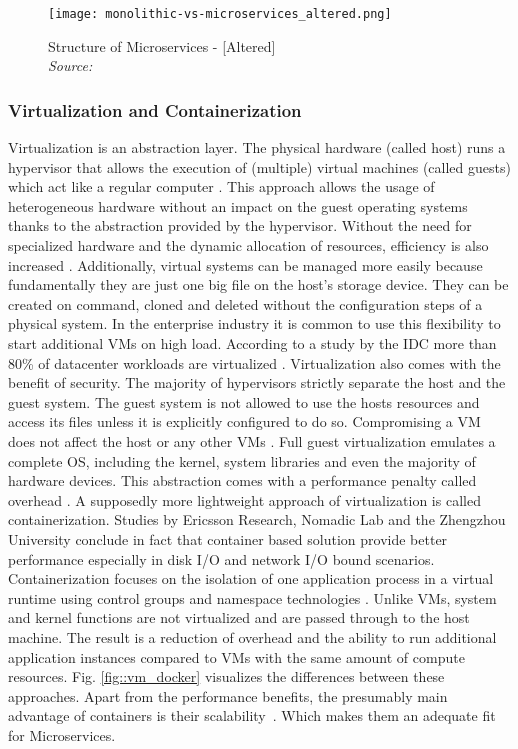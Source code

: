 \documentclass[12pt, a4paper]{article}
\begin{document}
        \begin{figure}
            \centering
            \texttt{[image: monolithic-vs-microservices\_altered.png]}
            \caption{Structure of Microservices - [Altered] \\\textit{Source:~\cite{redhat_micro}}}\label{fig::micro}
        \end{figure}

        \subsubsection{Virtualization and Containerization}
        Virtualization is an abstraction layer. The physical hardware (called host) runs a hypervisor that allows the execution of (multiple) virtual machines (called guests) which act like a regular computer \cite{vmbasics}. This approach allows the usage of heterogeneous hardware without an impact on the guest operating systems thanks to the abstraction provided by the hypervisor. Without the need for specialized hardware and the dynamic allocation of resources, efficiency is also increased \cite{redhat_venv}. Additionally, virtual systems can be managed more easily because fundamentally they are just one big file on the host's storage device. They can be created on command, cloned and deleted without the configuration steps of a physical system. In the enterprise industry it is common to use this flexibility to start additional \ac{VM}s on high load. According to a study by the \ac{IDC} more than 80\% of datacenter workloads are virtualized \cite{virtualaddoption}. Virtualization also comes with the benefit of security. The majority of hypervisors strictly separate the host and the guest system. The guest system is not allowed to use the hosts resources and access its files unless it is explicitly configured to do so. Compromising a \ac{VM} does not affect the host or any other \ac{VM}s \cite{redhat_venv}.\newline
        Full guest virtualization emulates a complete \ac{OS}, including the kernel, system libraries and even the majority of hardware devices. This abstraction comes with a performance penalty called overhead \cite{vmbasics}. A supposedly more lightweight approach of virtualization is called containerization. Studies by Ericsson Research, Nomadic Lab \cite{ieee_perfomance} and the Zhengzhou University \cite{zhengzhou_university} conclude in fact that container based solution provide better performance especially in disk \acs{I/O} and network \acs{I/O} bound scenarios. Containerization focuses on the isolation of one application process in a virtual runtime using control groups and namespace technologies \cite{cgroups}. Unlike \ac{VM}s, system and kernel functions are not virtualized and are passed through to the host machine. The result is a reduction of overhead and the ability to run additional application instances compared to \ac{VM}s with the same amount of compute resources. Fig. \ref{fig::vm_docker} visualizes the differences between these approaches.\newline
        Apart from the performance benefits, the presumably main advantage of containers is their scalability~\cite{cintainer_scale}. Which makes them an adequate fit for Microservices.
\end{document}
